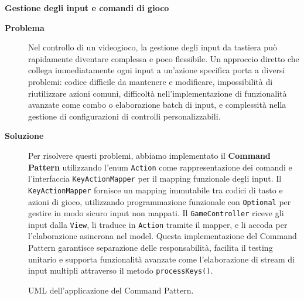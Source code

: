 \documentclass[a4paper,12pt]{report}
\begin{document}
\newpage
\noindent
\textbf{Gestione degli input e comandi di gioco}
\begin{description}
	\item[\textbf{Problema}]
	      Nel controllo di un videogioco, la gestione degli input da tastiera può rapidamente diventare complessa e poco flessibile. Un approccio diretto che collega immediatamente ogni input a un'azione
	      specifica porta a diversi problemi: codice difficile da mantenere e modificare, impossibilità di riutilizzare azioni comuni, difficoltà nell'implementazione di funzionalità avanzate come
	      combo o elaborazione batch di input, e complessità nella gestione di configurazioni di controlli personalizzabili.

	\item[\textbf{Soluzione}]
	      Per risolvere questi problemi, abbiamo implementato il \textbf{Command Pattern} utilizzando l'enum \texttt{Action} come rappresentazione dei comandi e l'interfaccia
	      \texttt{KeyActionMapper} per il mapping funzionale degli input. Il \texttt{KeyActionMapper} fornisce un mapping immutabile tra codici di tasto e azioni di gioco, utilizzando
	      programmazione funzionale con \texttt{Optional} per gestire in modo sicuro input non mappati. Il \texttt{GameController} riceve gli input dalla \texttt{View}, li traduce in
	      \texttt{Action} tramite il mapper, e li accoda per l'elaborazione asincrona nel model. Questa implementazione del Command Pattern garantisce separazione delle responsabilità, facilita
	      il testing unitario e supporta funzionalità avanzate come l'elaborazione di stream di input multipli attraverso il metodo \texttt{processKeys()}.
\end{description}
\begin{figure}[H]
	\centering{}
	
	\caption{UML dell'applicazione del Command Pattern.}
	\label{img:command}
\end{figure}
\end{document}

